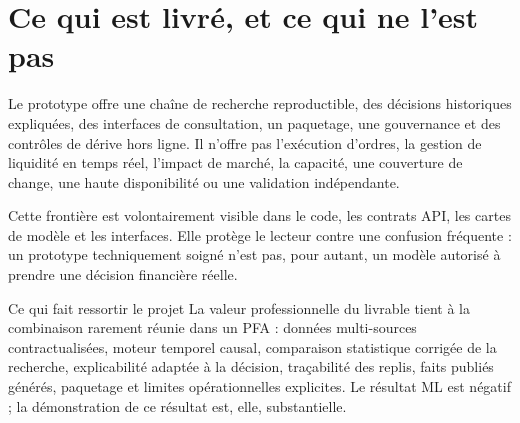 \section{Ce qui est livré, et ce qui ne l'est pas}

Le prototype offre une chaîne de recherche reproductible, des décisions
historiques expliquées, des interfaces de consultation, un paquetage, une
gouvernance et des contrôles de dérive hors ligne. Il n'offre pas l'exécution
d'ordres, la gestion de liquidité en temps réel, l'impact de marché, la capacité,
une couverture de change, une haute disponibilité ou une validation indépendante.

Cette frontière est volontairement visible dans le code, les contrats API, les
cartes de modèle et les interfaces. Elle protège le lecteur contre une confusion
fréquente : un prototype techniquement soigné n'est pas, pour autant, un modèle
autorisé à prendre une décision financière réelle.

\begin{resultatbox}{Ce qui fait ressortir le projet}
La valeur professionnelle du livrable tient à la combinaison rarement réunie
dans un PFA : données multi-sources contractualisées, moteur temporel causal,
comparaison statistique corrigée de la recherche, explicabilité adaptée à la
décision, traçabilité des replis, faits publiés générés, paquetage et limites
opérationnelles explicites. Le résultat ML est négatif ; la démonstration de ce
résultat est, elle, substantielle.
\end{resultatbox}
